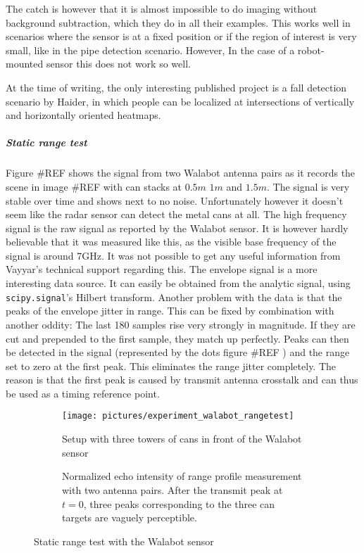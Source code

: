 The catch is however that it is almost impossible to do imaging without
background subtraction, which they do in all their examples. This works
well in scenarios where the sensor is at a fixed position or if the
region of interest is very small, like in the pipe detection scenario.
However, In the case of a robot-mounted sensor this does not work so
well.

At the time of writing, the only interesting published project is a fall
detection scenario \cite{Haider2017} by Haider, in which people can be
localized at intersections of vertically and horizontally oriented
heatmaps.

\subparagraph{Static range test}\label{static-range-test}

Figure \#REF shows the signal from two Walabot antenna pairs as it
records the scene in image \#REF with can stacks at \(0.5m\) \(1m\) and
\(1.5m\). The signal is very stable over time and shows next to no
noise. Unfortunately however it doesn't seem like the radar sensor can
detect the metal cans at all. The high frequency signal is the raw
signal as reported by the Walabot sensor. It is however hardly
believable that it was measured like this, as the visible base frequency
of the signal is around 7GHz. It was not possible to get any useful
information from Vayyar's technical support regarding this. The envelope
signal is a more interesting data source. It can easily be obtained from
the analytic signal, using \texttt{scipy.signal}'s Hilbert transform.
Another problem with the data is that the peaks of the envelope jitter
in range. This can be fixed by combination with another oddity: The last
180 samples rise very strongly in magnitude. If they are cut and
prepended to the first sample, they match up perfectly. Peaks can then
be detected in the signal (represented by the dots figure \#REF ) and
the range set to zero at the first peak. This eliminates the range
jitter completely. The reason is that the first peak is caused by
transmit antenna crosstalk and can thus be used as a timing reference
point.

\begin{figure}[htbp]
    \centering
    \label{fig:walabot_rangetest}
    \begin{subfigure}{\textwidth}
        \centering
        \texttt{[image: pictures/experiment\_walabot\_rangetest]}
        \caption{Setup with three towers of cans in front of the Walabot sensor}
    \end{subfigure}
    \begin{subfigure}{\textwidth}
        \centering
        \def\svgwidth{\linewidth}
        
        \caption{Normalized echo intensity of range profile measurement with two antenna pairs. After the transmit peak at \(t=0\), three peaks corresponding to the three can targets are vaguely perceptible. }
    \end{subfigure}
    \caption{Static range test with the Walabot sensor}
\end{figure}

